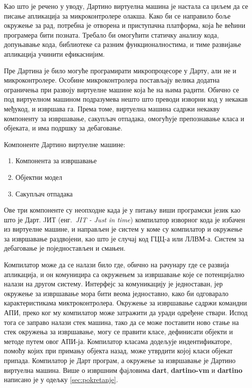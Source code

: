 \documentclass[12pt,oneside]{memoir}
\begin{document}
Као што је речено у уводу, Дартино виртуелна машина је настала са циљем да се писање апликација за микроконтролере олакша. Како би се направило боље окружење за рад, потребна је отворена и приступачна платформа, која ће већини програмера бити позната. Требало би омогућити статичку анализу кода, допуњавање кода, библиотеке са разним функционалностима, и тиме развијање апликација учинити ефикаснијим.

Пре Дартина је било могуће програмирати микропроцесоре у Дарту, али не и микроконтролере. Особине микроконтролера постављају велика додатна ограничења при развоју виртуелне машине која ће на њима радити. Обично се под виртуелном машином подразумева нешто што преводи изворни код у некакав међукод, и извршава га. Према томе, виртуелна машина садржи некакву компоненту за извршавање, сакупљач отпадака, омогућује препознавање класа и објеката, и има подршку за дебаговање.

Компоненте Дартино виртуелне машине:
\begin{enumerate}
\item Компонента за извршавање
\item Објектни модел
\item Сакупљач отпадака
\end{enumerate}

Ове три компоненте су неопходне када је у питању виши програмски језик као што је Дарт. JИТ (енг.~\textit{JIT - Just in time}) компилатор изворног кода је избачен из виртуелне машине, и направљен је систем у коме су компилатор и окружење за извршавање раздвојени, као што је случај код ГЦЦ-а или ЛЛВМ-а. Систем за дебаговање је поједностављен и смањен.

Компилатор може да се налази било где, обично на рачунару где се развија апликација, и он комуницира са окружењем за извршавање које се потенцијално налази на другом систему. Интерфејс за комуникацију је једноставан, јер окружење за извршавање мора бити веома једноставно, како би одговарало карактеристикама миктроконтролера.
Окружење за извршавање садржи командни АПИ, преко ког му компилатор може затражити да уради одређене ствари. Испод тога се заправо налази стек машина, тако да се може поставити ново стање на стек окружења за извршавање, могу се правити класе, дефинисати објекти и методе путем овог АПИ-ја. Компилатор класама додељује индентификаторе, помоћу којих при примању објекта назад, може утврдити којој класи објекат припада. Компилатор је Дарт програм, а окружење за извршавање је Дартино виртуелна машина. Више о извршним фајловима \textbf{dart}, \textbf{dartino-vm} и \textbf{dartino} написано је у одељку \ref{sec:pokretanje}.
\end{document}
